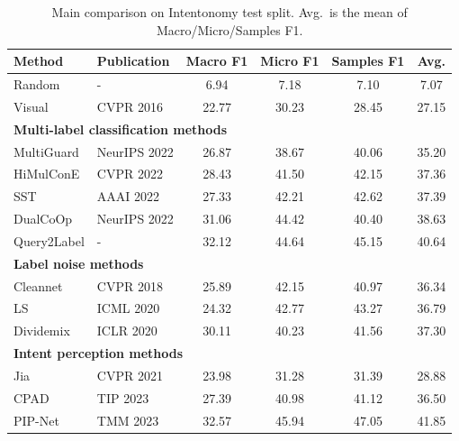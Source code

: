 \begin{table}[htbp]
\centering
\scriptsize
\caption{Main comparison on Intentonomy test split. Avg.\ is the mean of Macro/Micro/Samples F1. }
\label{tab:main_results}
\begingroup
\setlength{\tabcolsep}{3pt}
\begin{tabular}{llcccc}
\hline
Method & Publication & Macro F1 & Micro F1 & Samples F1 & Avg. \\
\hline
Random  & -  & 6.94  & 7.18  & 7.10  & 7.07 \\
Visual \cite{he_deep_2016}  & CVPR 2016  & 22.77  & 30.23  & 28.45  & 27.15 \\
\hline
\multicolumn{6}{l}{\textbf{Multi-label classification methods}} \\
MultiGuard \cite{jia_multiguard_2022}  & NeurIPS 2022  & 26.87  & 38.67  & 40.06  & 35.20 \\
HiMulConE \cite{zhang_use_2022}  & CVPR 2022  & 28.43  & 41.50  & 42.15  & 37.36 \\
SST \cite{chen_structured_2022}  & AAAI 2022  & 27.33  & 42.21  & 42.62  & 37.39 \\
DualCoOp \cite{sun_dualcoop_2022}  & NeurIPS 2022  & 31.06  & 44.42  & 40.40  & 38.63 \\
Query2Label \cite{liu_query2label_2021}  & -  & 32.12  & 44.64  & 45.15  & 40.64 \\
\hline
\multicolumn{6}{l}{\textbf{Label noise methods}} \\
Cleannet \cite{lee_cleannet_2018}  & CVPR 2018  & 25.89  & 42.15  & 40.97  & 36.34 \\
LS \cite{lukasik_does_2020}  & ICML 2020  & 24.32  & 42.77  & 43.27  & 36.79 \\
Dividemix \cite{li_dividemix_2019}  & ICLR 2020  & 30.11  & 40.23  & 41.56  & 37.30 \\
\hline
\multicolumn{6}{l}{\textbf{Intent perception methods}} \\
Jia \cite{jia_intentonomy_2021}  & CVPR 2021  & 23.98  & 31.28  & 31.39  & 28.88 \\
CPAD \cite{ye_cross-modality_2023}  & TIP 2023  & 27.39  & 40.98  & 41.12  & 36.50 \\
PIP-Net \cite{wang_prototype-based_2023}  & TMM 2023  & 32.57  & 45.94  & 47.05  & 41.85 \\

\end{tabular}
\end{table}
